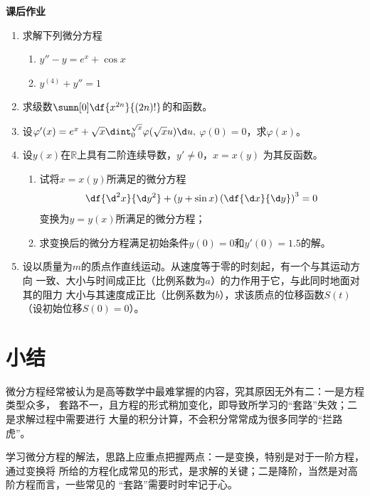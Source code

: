 \begin{ext}
	{\bf 课后作业}
	\begin{enumerate}
	  \item 求解下列微分方程
	  \begin{enumerate}[(1)]
	    \item $y''-y=e^x+\cos x$
	    \item $y^{(4)}+y''=1$
	  \end{enumerate}
	  \item 求级数$\sumn[0]\df{x^{2n}}{(2n)!}$的和函数。
	  \item 设$\varphi'(x)=e^x+\sqrt x\dint_0^{\sqrt x}\varphi(\sqrt x u)\d u,$
	  $\varphi(0)=0$，求$\varphi(x)$。
	  \item 设$y(x)$在$\mathbb{R}$上具有二阶连续导数，$y'\ne 0$，$x=x(y)$
	  为其反函数。
	    \begin{enumerate}[(1)]
	      \item 试将$x=x(y)$所满足的微分方程
	      $$\df{\d^2x}{\d y^2}+(y+\sin x)\left(\df{\d x}{\d y}\right)^3=0$$
	      变换为$y=y(x)$所满足的微分方程；%
	      \item 求变换后的微分方程满足初始条件$y(0)=0$和$y'(0)=1.5$的解。
	    \end{enumerate}
	    \item 设以质量为$m$的质点作直线运动。从速度等于零的时刻起，有一个与其运动方向
		一致、大小与时间成正比（比例系数为$a$）的力作用于它，与此同时地面对其的阻力
		大小与其速度成正比（比例系数为$b$），求该质点的位移函数$S(t)$（设初始位移$S(0)=0$）。
	  \end{enumerate}
\end{ext}

\section{小结}

微分方程经常被认为是高等数学中最难掌握的内容，究其原因无外有二：一是方程类型众多，
套路不一，且方程的形式稍加变化，即导致所学习的“套路”失效；二是求解过程中需要进行
大量的积分计算，不会积分常常成为很多同学的“拦路虎”。

学习微分方程的解法，思路上应重点把握两点：一是变换，特别是对于一阶方程，通过变换将
所给的方程化成常见的形式，是求解的关键；二是降阶，当然是对高阶方程而言，一些常见的
“套路”需要时时牢记于心。

